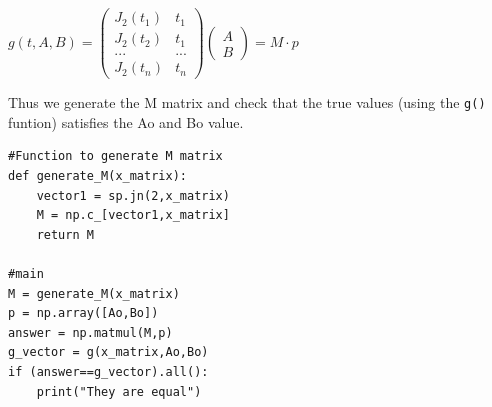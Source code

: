 \documentclass[11pt, a4paper]{article}
\begin{document}
\begin{center}
     $   g(t,A,B) = 
    \begin{pmatrix}
    J_{2}(t_{1})& t_{1}\\
    J_{2}(t_{2}) & t_{1}\\
    ... & ...\\
    J_{2}(t_{n})& t_{n}
    \end{pmatrix}
     \begin{pmatrix}
        A \\
        B
    \end{pmatrix} = M\cdot p$
    
\end{center}
\par Thus we generate the  M matrix and check that the true values (using the \verb|g()| funtion) satisfies the Ao and Bo value.
\begin{lstlisting}
#Function to generate M matrix
def generate_M(x_matrix):
	vector1 = sp.jn(2,x_matrix)
	M = np.c_[vector1,x_matrix]
	return M

#main
M = generate_M(x_matrix)
p = np.array([Ao,Bo])
answer = np.matmul(M,p)
g_vector = g(x_matrix,Ao,Bo)
if (answer==g_vector).all():
	print("They are equal")
\end{lstlisting}
    
\end{document}
